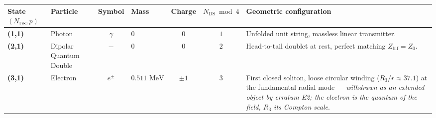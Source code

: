 \documentclass[11pt,a4paper]{article}
\theoremstyle{plain}
\theoremstyle{remark}
\newcommand{\Ncd}{\ensuremath{N_{\mathrm{DS}}}}
\begin{document}
{\small
\renewcommand{\arraystretch}{1.2}
\begin{longtable}{p{1.5cm} p{1.9cm} c p{1.6cm} c c >{\raggedright\arraybackslash}p{4.0cm}}
\toprule
\textbf{State $(\Ncd,p)$} & \textbf{Particle} & \textbf{Symbol} & \textbf{Mass} & \textbf{Charge} & \textbf{$\Ncd \bmod 4$} & \textbf{Geometric configuration} \\
\midrule
\endhead
\bottomrule
\endfoot

\textbf{(1,1)} & Photon & $\gamma$ & $0$ & $0$ & $1$ & Unfolded unit string, massless linear transmitter. \\
\textbf{(2,1)} & Dipolar Quantum Double & $-$ & $0$ & $0$ & $2$ & Head-to-tail doublet at rest, perfect matching $Z_{\text{bif}} = Z_0$. \\
\textbf{(3,1)} & Electron & $e^\pm$ & $0.511\text{ MeV}$ & $\pm 1$ & $3$ & First closed soliton, loose circular winding ($R_3/r \approx 37.1$) at the fundamental radial mode --- \emph{withdrawn as an extended object by erratum E2; the electron is the quantum of the field, $R_3$ its Compton scale}. \\
\end{longtable}}

\newpage
\end{document}
